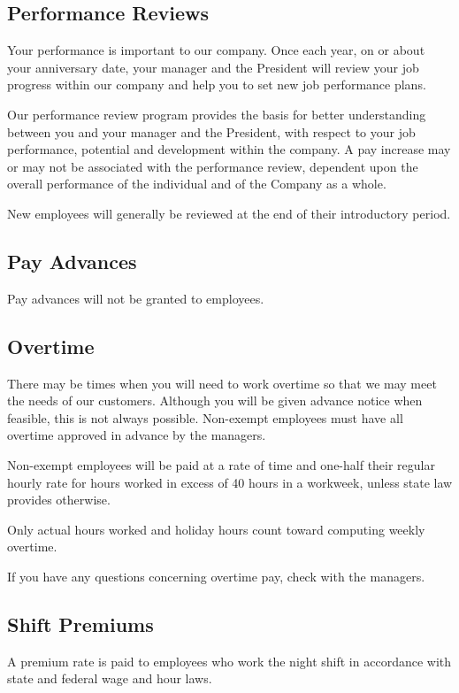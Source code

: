 \subsection{Performance Reviews}

Your performance is important to our company. Once each year, on or about your anniversary date, your manager and the President will review your job progress within our company and help you to set new job performance plans.

Our performance review program provides the basis for better understanding between you and your manager and the President, with respect to your job performance, potential and development within the company. A pay increase may or may not be associated with the performance review, dependent upon the overall performance of the individual and of the Company as a whole.

New employees will generally be reviewed at the end of their introductory period.

\subsection{Pay Advances}

Pay advances will not be granted to employees.

\subsection{Overtime}

There may be times when you will need to work overtime so that we may meet the needs of our customers. Although you will be given advance notice when feasible, this is not always possible. Non-exempt employees must have all overtime approved in advance by the managers.

Non-exempt employees will be paid at a rate of time and one-half their regular hourly rate for hours worked in excess of 40 hours in a workweek, unless state law provides otherwise.

Only actual hours worked and holiday hours count toward computing weekly overtime.

If you have any questions concerning overtime pay, check with the managers.

\subsection{Shift Premiums}

A premium rate is paid to employees who work the night shift in accordance with state and federal wage and hour laws.

